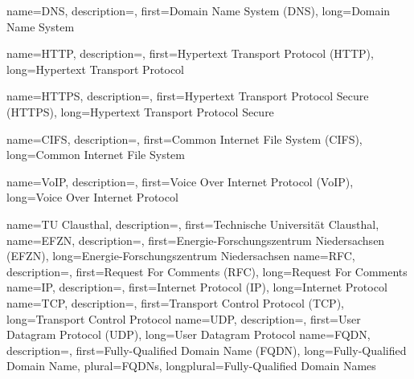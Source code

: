 {%
    name={DNS},
    description={},
    first={Domain Name System (DNS)},
    long={Domain Name System}
}

{%
    name={HTTP},
    description={},
    first={Hypertext Transport Protocol (HTTP)},
    long={Hypertext Transport Protocol}

}
{%
    name={HTTPS},
    description={},
    first={Hypertext Transport Protocol Secure (HTTPS)},
    long={Hypertext Transport Protocol Secure}

}
{%
    name={CIFS},
    description={},
    first={Common Internet File System (CIFS)},
    long={Common Internet File System}

}
{%
    name={VoIP},
    description={},
    first={Voice Over Internet Protocol (VoIP)},
    long={Voice Over Internet Protocol}

}
{%
    name={TU Clausthal},
    description={},
    first={Technische Universität Clausthal},
}
{%
    name={EFZN},
    description={},
    first={Energie-Forschungszentrum Niedersachsen (EFZN)},
    long={Energie-Forschungszentrum Niedersachsen}
}
{%
    name={RFC},
    description={},
    first={Request For Comments (RFC)},
    long={Request For Comments}
}
{%
    name={IP},
    description={},
    first={Internet Protocol (IP)},
    long={Internet Protocol}
}
{%
    name={TCP},
    description={},
    first={Transport Control Protocol (TCP)},
    long={Transport Control Protocol}
}
{%
    name={UDP},
    description={},
    first={User Datagram Protocol (UDP)},
    long={User Datagram Protocol}
}
{%
    name={FQDN},
    description={},
    first={Fully-Qualified Domain Name (FQDN)},
    long={Fully-Qualified Domain Name},
    plural={FQDNs},
    longplural={Fully-Qualified Domain Names}
}
